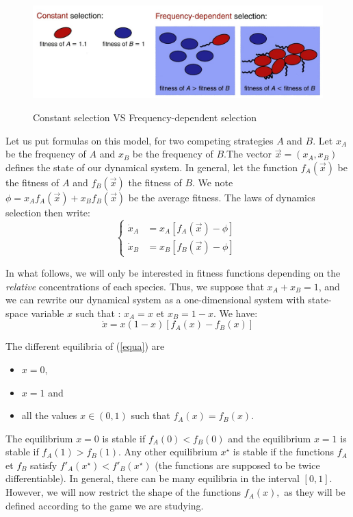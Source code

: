\begin{figure}[hbtp] \
\centering
\includegraphics[scale=0.6]{im1.jpg}
\caption{Constant selection VS Frequency-dependent selection}
\label{frequency}
\end{figure}
Let us put formulas on this model, for two competing strategies $A$ and $B.$ Let  $x_A$ be the frequency of $A$ and $x_B$ be the frequency of $B.$The vector $\overrightarrow{x} = (x_A,x_B)$ defines the state of our dynamical system. In general, let the function $f_A(\overrightarrow{x})$ be the fitness of $A$ and $f_B(\overrightarrow{x})$ the fitness of $B.$ We note $\phi = x_A f_A(\overrightarrow{x})+ x_B f_B(\overrightarrow{x})$ be the average fitness. The laws of dynamics selection then write:
\begin{equation}
\begin{cases}
\dot{x}_A &= x_A \left[ f_A(\overrightarrow{x})-\phi \right] \\
\dot{x}_B &= x_B \left[ f_B(\overrightarrow{x})-\phi \right] \
\end{cases}
\label{syst}
\end{equation}

In what follows, we will only be interested in fitness functions depending on the \emph{relative} concentrations of each species.  Thus, we suppose that $x_A + x_B = 1$, and we can rewrite our dynamical system as a one-dimensional system with state-space variable $x$ such that : $x_A = x$ et $x_B = 1-x$. We have:
\begin{equation}
\dot{x} = x(1-x) \left[ f_A(x) - f_B(x) \right] \label{equa}
\end{equation}

The different equilibria of (\ref{equa}) are
\begin{itemize}
\item $x=0$, \item $x=1$ and \item all the values $x \in (0,1)$ such that $f_A(x) = f_B(x)$.\end{itemize} The equilibrium $x=0$ is stable if $f_A(0) < f_B(0)$ and the equilibrium $x=1$ is stable if $f_A(1) > f_B(1)$. Any other equilibrium $x^{\star}$ is stable if the functions $f_A$ et $f_B$ satisfy $f'_A(x^{\star}) < f'_B(x^{\star})$ (the functions are supposed to be twice differentiable). In general, there can be many equilibria in the interval $\left[ 0,1 \right].$ However, we will now restrict the shape of the functions $f_A(x),$ as they will be defined according to the game we are studying.
